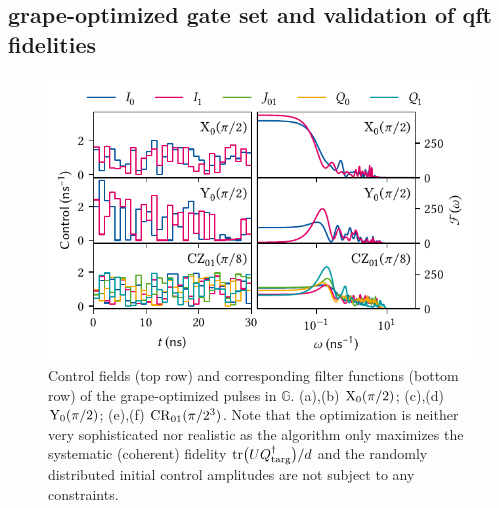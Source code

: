 \subsection{\texorpdfstring{\acrshort{grape}}{GRAPE}-optimized gate set and validation of \texorpdfstring{\acrshort{qft}}{QFT} fidelities}\label{subsec:app:ff:fidelity:qft}
\begin{figure}
    \centering
    \includegraphics{img/pdf/filter_functions/qft_atomic_pulses}
    \caption[]{
        Control fields (top row) and corresponding filter functions (bottom row) of the \gls{grape}-optimized pulses in $\mathbb{G}$.
        (a),(b) $\mathrm{X}_0(\pi/2)$; (c),(d) $\mathrm{Y}_0(\pi/2)$; (e),(f) $\mathrm{CR}_{01}(\pi/2^3)$.
        Note that the optimization is neither very sophisticated nor realistic as the algorithm only maximizes the systematic (coherent) fidelity $\mathrm{tr}\bigl(UQ^\dagger_{\mathrm{targ}}\bigr)/d$ and the randomly distributed initial control amplitudes are not subject to any constraints.
    }
    \label{fig:app:ff:qft:gates}
\end{figure}

